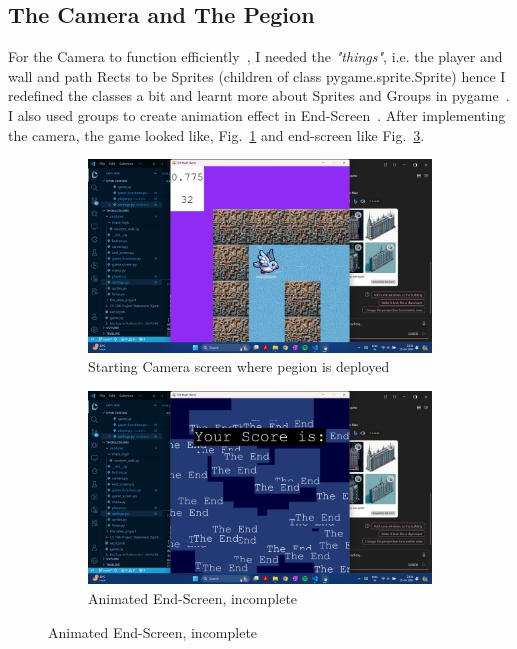 \documentclass{article}
\begin{document}
\subsection{The Camera and The Pegion}
For the Camera to function efficiently~\cite{camera_tutorial}, I needed the \textit{"things"}, i.e. the player and wall and path Rects to be Sprites (children of class pygame.sprite.Sprite) hence I redefined the classes a bit and learnt more about Sprites and Groups in pygame~\cite{sprite_reference}. I also used groups to create animation effect in End-Screen~\cite*{end-scren_animation}. After implementing the camera, the game looked like, Fig.~\ref{fig:camera1} and end-screen like Fig.~\ref{fig:camera2}.

\begin{figure}[h]
    \caption[1]{}
    \begin{subfigure}[b]{0.5\textwidth}
        \centering
        \includegraphics[width=\textwidth]{screenshots/Screenshot (174).png}
        \caption[(a)]{Starting Camera screen where pegion is deployed}
        \label{fig:camera1}
    \end{subfigure}
    \begin{subfigure}[b]{0.5\textwidth}
        \centering
        \includegraphics[width=\textwidth]{screenshots/Screenshot (175).png}
        \caption[(a)]{Animated End-Screen, incomplete}
        \label{fig:camera2}
    \end{subfigure}
\end{figure}
\end{document}
